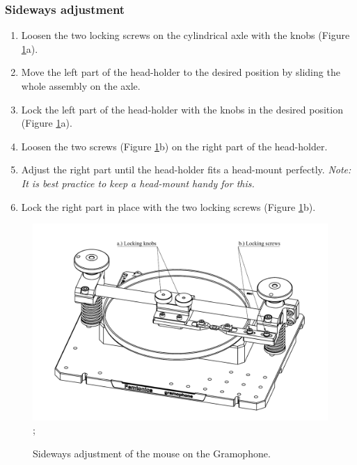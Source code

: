 \documentclass[11pt,a4paper]{article}
\newcommand{\note}[1]{\textit{Note: {#1}}}
\begin{document}
\subsubsection{Sideways adjustment}
\begin{enumerate}
\item Loosen the two locking screws on the cylindrical axle with the knobs (Figure \ref{fig:labels_side}a).
\item Move the left part of the head-holder to the desired position by sliding the whole assembly on the axle.
\item Lock the left part of the head-holder with the knobs in the desired position (Figure \ref{fig:labels_side}a).
\item Loosen the two screws (Figure \ref{fig:labels_side}b) on the right part of the head-holder.
\item Adjust the right part until the head-holder fits a head-mount perfectly. \note{It is best practice to keep a head-mount handy for this.}
\item Lock the right part in place with the two locking screws (Figure \ref{fig:labels_side}b).
\end{enumerate}

\begin{figure}[H] %
\centering
\includegraphics[clip, trim=1cm 0cm 1cm 1cm, width=1.00\textwidth]{labels_side.PDF};
\caption{Sideways adjustment of the mouse on the Gramophone.}
\label{fig:labels_side}
\end{figure}
\end{document}
